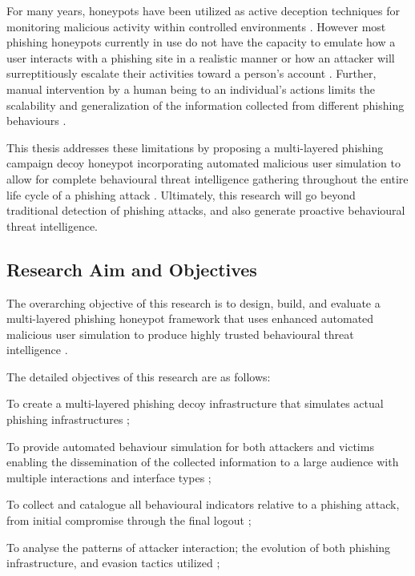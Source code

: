 For many years, honeypots have been utilized as active deception techniques for monitoring malicious activity within controlled environments \cite{Seifert2006Taxonomy}. However most phishing honeypots currently in use do not have the capacity to emulate how a user interacts with a phishing site in a realistic manner or how an attacker will surreptitiously escalate their activities toward a person’s account \cite{Leita2008Phishing}. Further, manual intervention by a human being to an individual’s actions limits the scalability and generalization of the information collected from different phishing behaviours \cite{Bringer2012HoneypotSurvey}.

This thesis addresses these limitations by proposing a multi-layered phishing campaign decoy honeypot incorporating automated malicious user simulation to allow for complete behavioural threat intelligence gathering throughout the entire life cycle of a phishing attack \cite{Moric2025Honeypots}. Ultimately, this research will go beyond traditional detection of phishing attacks, and also generate proactive behavioural threat intelligence.

\subsection{Research Aim and Objectives}

The overarching objective of this research is to design, build, and evaluate a multi-layered phishing honeypot framework that uses enhanced automated malicious user simulation to produce highly trusted behavioural threat intelligence \cite{Moric2025Honeypots}.

The detailed objectives of this research are as follows:

To create a multi-layered phishing decoy infrastructure that simulates actual phishing infrastructures \cite{Leita2008Phishing};

To provide automated behaviour simulation for both attackers and victims enabling the dissemination of the collected information to a large audience with multiple interactions and interface types \cite{Kreibich2005Replay,Alata2006Honeynet};

To collect and catalogue all behavioural indicators relative to a phishing attack, from initial compromise through the final logout \cite{Song2005HoneyStat};

To analyse the patterns of attacker interaction; the evolution of both phishing infrastructure, and evasion tactics utilized \cite{Holz2006AttackPatterns,Freiling2010Evasion};


